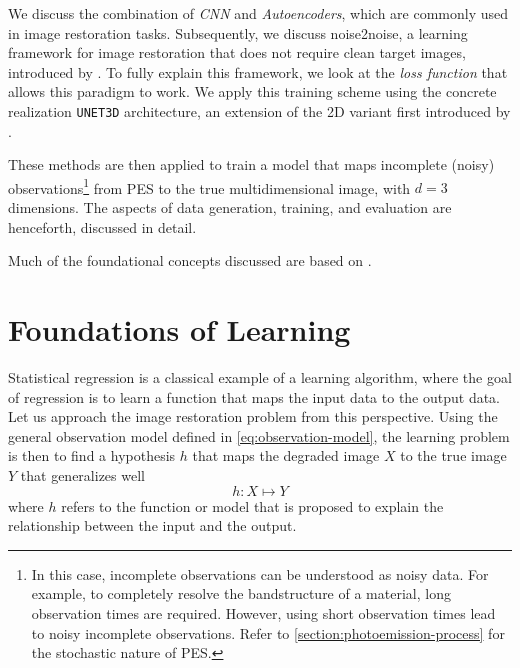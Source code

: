 We discuss the combination of \textit{\gls{CNN}} and \textit{Autoencoders}, which are commonly used in image restoration tasks. Subsequently, we discuss \gls{noise2noise}, a learning framework for image restoration that does not require clean target images, introduced by \citeauthor{lehtinenNoise2NoiseLearningImage2018}. To fully explain this framework, we look at the \textit{loss function} that allows this paradigm to work. We apply this training scheme using the concrete realization \texttt{UNET3D} architecture, an extension of  the 2D variant first introduced by \citeauthor{ronnebergerUNetConvolutionalNetworks}.

These methods are then applied to train a model that maps incomplete (noisy)  observations\footnote{In this case, incomplete observations can be understood as noisy data. For example, to completely resolve the bandstructure of a material, long observation times are required. However, using short observation times lead to noisy incomplete observations. Refer to \cref{section:photoemission-process} for the stochastic nature of \gls{PES}.} from \gls{PES} to the true multidimensional image, with $d=3$ dimensions. The aspects of data generation, training, and evaluation are henceforth, discussed in detail.

Much of the foundational concepts discussed are based on \cite{shalev-shwartzUnderstandingMachineLearning2014a,jamesIntroductionStatisticalLearning2013,tibshiraniElementsStatisticalLearning,goodfellowDeepLearning2016}.

\section{Foundations of Learning}
Statistical regression is a classical example of a learning algorithm, where the goal of regression is to learn a function that maps the input data to the output data. Let us approach the image restoration problem from this perspective. Using the general observation model defined in \cref{eq:observation-model}, the learning problem is then to find a hypothesis $h$  that maps the degraded image $X$ to the true image $Y$ that generalizes well
\begin{equation}
    h: X \mapsto Y
\end{equation}
where $h$ refers to the function or model that is proposed to explain the relationship between the input and the output.

